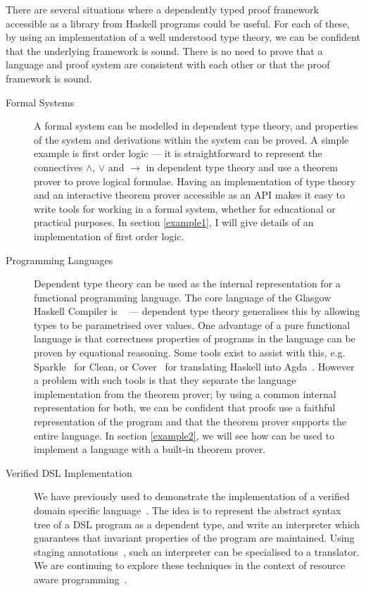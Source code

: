 There are several situations where a dependently typed proof framework
accessible as a library from Haskell programs could be useful.  For
each of these, by using an implementation of a well understood type
theory, we can be confident that the underlying framework is
sound. There is no need to prove that a language and proof system are
consistent with each other or that the proof framework is
sound.

\begin{description}
\item[Formal Systems] 
A formal system can be modelled in dependent type theory, and
properties of the system and derivations within the system can be
proved. A simple example is first order logic --- it is
straightforward to represent the connectives $\land$, $\lor$ and $\to$
in dependent type theory and use a theorem prover to prove logical
formulae.
Having an implementation of type theory and an interactive theorem
prover accessible as an API makes it easy to write tools for working
in a formal system, whether for educational or practical purposes.
In section \ref{example1}, I will give details of an implementation of
first order logic.

\item[Programming Languages] 
Dependent type theory can be used as the internal representation for a
functional programming language. The core language of the Glasgow
Haskell Compiler is \SystemF{}~\cite{core} --- dependent type theory
generalises this by allowing types to be parametrised over values.
One advantage of a pure functional language is that correctness
properties of programs in the language can be proven by equational
reasoning.  Some tools exist to assist with this,
e.g. Sparkle~\cite{sparkle} for Clean, or Cover~\cite{cover} for
translating Haskell into Agda~\cite{agda}. However a problem with such
tools is that they separate the language implementation from the
theorem prover; by using a common internal representation for both, we can
be confident that proofs use a faithful representation of the program
and that the theorem prover supports the entire language. In section
\ref{example2}, we will see how \Ivor{} can be used to implement a
language with a built-in theorem prover.

\item[Verified DSL Implementation]
We have previously used \Ivor{} to demonstrate the implementation of
a verified domain specific language~\cite{dtpmsp-gpce}. The idea is to
represent the abstract syntax tree of a DSL program as a dependent
type, and write an interpreter which guarantees that invariant
properties of the program are maintained. Using staging
annotations~\cite{multi-taha}, such an interpreter can be specialised
to a translator. We are continuing to explore these techniques in the
context of resource aware programming~\cite{dt-framework}.

\end{description}

